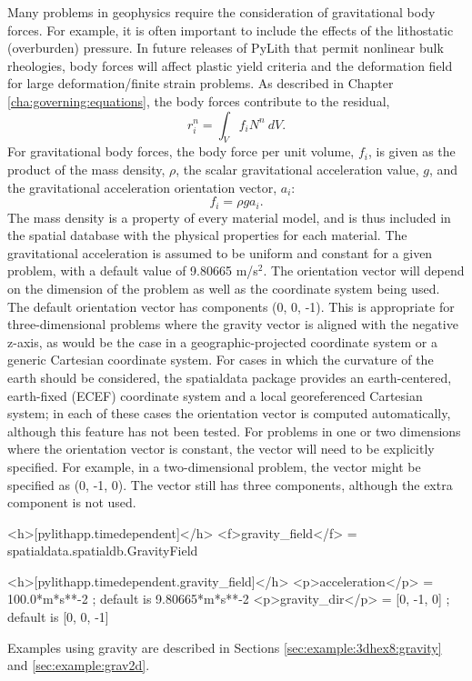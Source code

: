 Many problems in geophysics require the consideration of gravitational
body forces. For example, it is often important to include the effects
of the lithostatic (overburden) pressure. In future releases of PyLith
that permit nonlinear bulk rheologies, body forces will affect plastic
yield criteria and the deformation field for large deformation/finite
strain problems. As described in Chapter \vref{cha:governing:equations},
the body forces contribute to the residual,
\begin{equation}
r_{i}^{n}=\int_{V}f_{i}N^{n}\: dV.
\end{equation}
For gravitational body forces, the body force per unit volume, $f_{i}$,
is given as the product of the mass density, $\rho$, the scalar gravitational
acceleration value, $g$, and the gravitational acceleration orientation
vector, $a_{i}$:
\begin{equation}
f_{i}=\rho ga_{i}.
\end{equation}
The mass density is a property of every material model, and is thus
included in the spatial database with the physical properties for
each material. The gravitational acceleration is assumed to be uniform
and constant for a given problem, with a default value of 9.80665
m/s$^{\text{2}}$. The orientation vector will depend on the dimension
of the problem as well as the coordinate system being used. The default
orientation vector has components (0, 0, -1). This is appropriate
for three-dimensional problems where the gravity vector is aligned
with the negative z-axis, as would be the case in a geographic-projected
coordinate system or a generic Cartesian coordinate system. For cases
in which the curvature of the earth should be considered, the spatialdata
package provides an earth-centered, earth-fixed (ECEF) coordinate
system and a local georeferenced Cartesian system; in each of these
cases the orientation vector is computed automatically, although this
feature has not been tested. For problems in one or two dimensions
where the orientation vector is constant, the vector will need to
be explicitly specified. For example, in a two-dimensional problem,
the vector might be specified as (0, -1, 0). The vector still has
three components, although the extra component is not used.

\begin{cfg}
<h>[pylithapp.timedependent]</h>
<f>gravity_field</f> = spatialdata.spatialdb.GravityField

<h>[pylithapp.timedependent.gravity_field]</h>
<p>acceleration</p> = 100.0*m*s**-2  ; default is 9.80665*m*s**-2
<p>gravity_dir</p> = [0, -1, 0]  ; default is [0, 0, -1]
\end{cfg}
Examples using gravity are described in Sections \vref{sec:example:3dhex8:gravity}
and \vref{sec:example:grav2d}.

